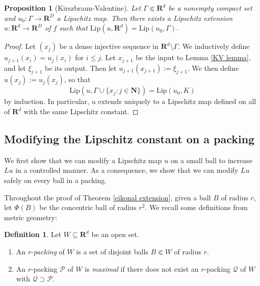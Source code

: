 \documentclass[reqno,11pt]{amsart}
\newcommand{\NN}{\mathbf{N}}
\newcommand{\RR}{\mathbf{R}}
\newcommand{\Lip}{\mathrm{Lip}}
\newcommand{\dfn}[1]{\emph{#1}\index{#1}}
\newtheorem{proposition}[theorem]{Proposition}
\theoremstyle{definition}
\newtheorem{definition}[theorem]{Definition}
\numberwithin{equation}{section}
\begin{document}
\begin{proposition}[Kirszbraun-Valentine]
Let $\Gamma \Subset \RR^d$ be a nonempty compact set and $u_0: \Gamma \to \RR^D$ a Lipschitz map.
Then there exists a Lipschitz extension $u: \RR^d \to \RR^D$ of $f$ such that $\Lip(u, \RR^d) = \Lip(u_0, \Gamma)$.
\end{proposition}
\begin{proof}
Let $(x_j)$ be a dense injective sequence in $\RR^d \setminus \Gamma$.
We inductively define $u_{j + 1}(x_i) = u_j(x_i)$ for $i \leq j$.
Let $x_{j + 1}$ be the input to Lemma \ref{KV lemma}, and let $\xi_{j + 1}$ be its output.
Then let $u_{j + 1}(x_{j + 1}) := \xi_{j + 1}$.
We then define $u(x_j) := u_j(x_j)$, so that
$$\Lip(u, \Gamma \cup \{x_j: j \in \NN\}) = \Lip(u_0, K)$$
by induction.
In particular, $u$ extends uniquely to a Lipschitz map defined on all of $\RR^d$ with the same Lipschitz constant.
\end{proof}


\subsection{Modifying the Lipschitz constant on a packing}
We first show that we can modify a Lipschitz map $u$ on a small ball to increase $Lu$ in a controlled manner.
As a consequence, we show that we can modify $Lu$ safely on every ball in a packing.

Throughout the proof of Theorem \ref{eikonal extension}, given a ball $B$ of radius $r$, let $\Phi(B)$ be the concentric ball of radius $r^2$.
We recall some definitions from metric geometry:

\begin{definition}
Let $W \subseteq \RR^d$ be an open set.
\begin{enumerate}
\item An $r$-\dfn{packing} of $W$ is a set of disjoint balls $B \Subset W$ of radius $r$.
\item An $r$-packing $\mathscr P$ of $W$ is \dfn{maximal} if there does not exist an $r$-packing $\mathscr Q$ of $W$ with $\mathscr Q \supset \mathscr P$.
\end{enumerate}
\end{definition}
\end{document}
